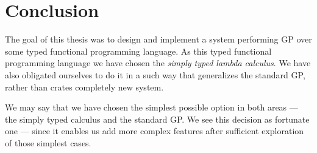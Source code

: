 \documentclass[12pt,a4paper]{report}
\newcommand{\lterm}{$\lambda$-term\xspace}
\begin{document}
%



\chapter*{Conclusion}

The goal of this thesis was to design and implement a system
performing GP over some typed functional programming language.
As this typed functional programming language we have chosen the 
\textit{simply typed lambda calculus}.
We have also obligated ourselves to do it in a such way that 
generalizes the standard GP, rather than
crates completely new system.

We may say that we have chosen the simplest possible
option in both areas --- the simply typed calculus and the standard GP.
We see this decision as fortunate one --- since it enables us add more
complex features after sufficient exploration of those simplest cases.
   
\end{document}
